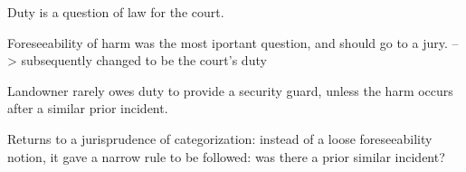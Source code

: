 %
\item Duty is a question of law for the court.
\item Foreseeability of harm was the most iportant question, and should go to a jury. --> subsequently changed to be the court's duty
%
%
\item Landowner rarely owes duty to provide a security guard, unless the harm occurs after a similar prior incident.
\item Returns to a jurisprudence of categorization: instead of a loose foreseeability notion, it gave a narrow rule to be followed: was there a prior similar incident?
